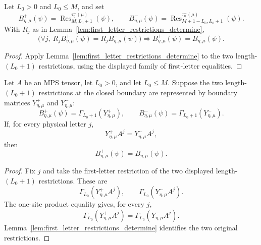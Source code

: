 \begin{lemma}
    \label{lem:boundary_restriction_from_fixed_letters}
    \leanok
    Let $L_0>0$ and $L_0\le M$, and set
    \[
        B^+_{\eta,\mu}(\psi)
        =
        \operatorname{Res}^{\tau^+_{\eta}(\mu)}_{M,L_0+1}(\psi),
        \qquad
        B^-_{\eta,\mu}(\psi)
        =
        \operatorname{Res}^{\tau^-_{\eta}(\mu)}_{M+1-L_0,L_0+1}(\psi).
    \]
    With $R_j$ as in Lemma~\ref{lem:first_letter_restrictions_determine},
    \[
        \bigl(\forall j,\ R_jB^+_{\eta,\mu}(\psi)
        =
        R_jB^-_{\eta,\mu}(\psi)\bigr)
        \Longrightarrow
        B^+_{\eta,\mu}(\psi)=B^-_{\eta,\mu}(\psi).
    \]
\end{lemma}

\begin{proof}
    \leanok
    Apply Lemma~\ref{lem:first_letter_restrictions_determine} to the two
    length-$(L_0+1)$ restrictions, using the displayed family of first-letter
    equalities.
\end{proof}

\begin{lemma}
    \label{lem:closed_boundary_restriction_from_right_products}
    \leanok
    Let $A$ be an MPS tensor, let $L_0>0$, and let $L_0\le M$. Suppose the two
    length-$(L_0+1)$ restrictions at the closed boundary are represented by
    boundary matrices $Y^+_{\eta,\mu}$ and $Y^-_{\eta,\mu}$:
    \[
        B^+_{\eta,\mu}(\psi)=\Gamma_{L_0+1}(Y^+_{\eta,\mu}),
        \qquad
        B^-_{\eta,\mu}(\psi)=\Gamma_{L_0+1}(Y^-_{\eta,\mu}).
    \]
    If, for every physical letter $j$,
    \[
        Y^+_{\eta,\mu}A^j
        =
        Y^-_{\eta,\mu}A^j,
    \]
    then
    \[
        B^+_{\eta,\mu}(\psi)=B^-_{\eta,\mu}(\psi).
    \]
\end{lemma}

\begin{proof}
    \leanok
    Fix $j$ and take the first-letter restriction of the two displayed
    length-$(L_0+1)$ restrictions. These are
    \[
        \Gamma_{L_0}(Y^+_{\eta,\mu}A^j),
        \qquad
        \Gamma_{L_0}(Y^-_{\eta,\mu}A^j).
    \]
    The one-site product equality gives, for every $j$,
    \[
        \Gamma_{L_0}(Y^+_{\eta,\mu}A^j)
        =
        \Gamma_{L_0}(Y^-_{\eta,\mu}A^j).
    \]
    Lemma~\ref{lem:first_letter_restrictions_determine} identifies the two
    original restrictions.
\end{proof}

